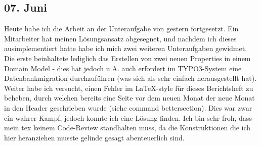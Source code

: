 \subsection{07. Juni}
Heute habe ich die Arbeit an der Unteraufgabe von gestern fortgesetzt. Ein Mitarbeiter hat meinen Lösungsansatz abgesegnet, und nachdem ich dieses ausimplementiert hatte habe ich mich zwei weiteren Unteraufgaben gewidmet. Die erste beinhaltete lediglich das Erstellen von zwei neuen Properties in einem Domain Model - dies hat jedoch u.A. auch erfordert im TYPO3-System eine Datenbankmigration durchzuführen (was sich als sehr einfach herausgestellt hat).
Weiter habe ich versucht, einen Fehler im \LaTeX -style für dieses Berichtsheft zu beheben, durch welchen bereits eine Seite vor dem neuen Monat der neue Monat in den Header geschrieben wurde (siehe command bettersection). Dies war zwar ein wahrer Kampf, jedoch konnte ich eine Lösung finden. Ich bin sehr froh, dass mein tex keinem Code-Review standhalten muss, da die Konstruktionen die ich hier heranziehen musste gelinde gesagt abenteuerlich sind.